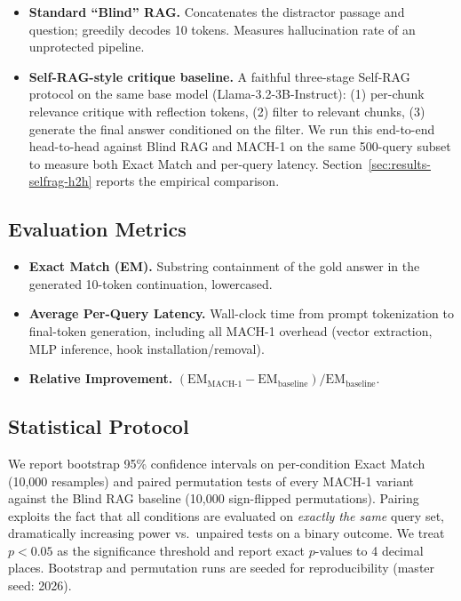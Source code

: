 \documentclass[conference]{IEEEtran}
\begin{document}
\begin{itemize}
    \item \textbf{Standard ``Blind'' RAG.} Concatenates the distractor passage and question; greedily decodes 10 tokens. Measures hallucination rate of an unprotected pipeline.
    \item \textbf{Self-RAG-style critique baseline.} A faithful three-stage Self-RAG~\cite{asai2023selfrag} protocol on the same base model (Llama-3.2-3B-Instruct): (1) per-chunk relevance critique with reflection tokens, (2) filter to relevant chunks, (3) generate the final answer conditioned on the filter. We run this end-to-end head-to-head against Blind RAG and MACH-1 on the same 500-query subset to measure both Exact Match and per-query latency. Section~\ref{sec:results-selfrag-h2h} reports the empirical comparison.
\end{itemize}

\subsection{Evaluation Metrics}

\begin{itemize}
    \item \textbf{Exact Match (EM).} Substring containment of the gold answer in the generated 10-token continuation, lowercased.
    \item \textbf{Average Per-Query Latency.} Wall-clock time from prompt tokenization to final-token generation, including all MACH-1 overhead (vector extraction, MLP inference, hook installation/removal).
    \item \textbf{Relative Improvement.} $(\text{EM}_{\text{MACH-1}} - \text{EM}_{\text{baseline}}) / \text{EM}_{\text{baseline}}$.
\end{itemize}

\subsection{Statistical Protocol}\label{sec:stat-protocol}

We report bootstrap 95\% confidence intervals on per-condition Exact Match (10{,}000 resamples) and paired permutation tests of every MACH-1 variant against the Blind RAG baseline (10{,}000 sign-flipped permutations). Pairing exploits the fact that all conditions are evaluated on \emph{exactly the same} query set, dramatically increasing power vs.\ unpaired tests on a binary outcome. We treat $p < 0.05$ as the significance threshold and report exact $p$-values to 4 decimal places. Bootstrap and permutation runs are seeded for reproducibility (master seed: 2026).
\end{document}
